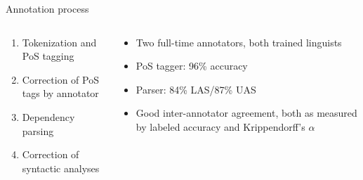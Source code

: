 \documentclass[orientation=portrait]{ltgposter12}
\newlength\interblock
\begin{document}
\begin{columns}[t]
\begin{column}{0.5\textwidth}
        \begin{block}{Annotation process}
            \begin{columns}[T]
                \begin{column}{0.4\textwidth}
                    \begin{enumerate}
                        \item Tokenization and PoS tagging
                        \item Correction of PoS tags by annotator
                        \item Dependency parsing
                        \item Correction of syntactic analyses
                    \end{enumerate}
                \end{column}

                \begin{column}{0.52\textwidth}
                    \begin{itemize}
                        \item Two full-time annotators, both trained linguists
                        \item PoS tagger: 96\% accuracy
                        \item Parser: 84\% LAS/87\% UAS
                        \item Good inter-annotator agreement, both as measured
                            by labeled accuracy and Krippendorff's $\alpha$
                    \end{itemize}
                \end{column}
            \end{columns}
        \end{block}
        \vspace{\interblock}


\end{column}
\end{columns}
\end{document}
